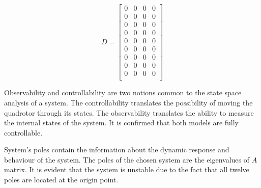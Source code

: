  \begin{equation}
 	D=\begin{bmatrix}
 	0 & 0 & 0 & 0 \\
 	0 & 0 & 0 & 0 \\
 	0 & 0 & 0 & 0 \\
 	0 & 0 & 0 & 0 \\
 	0 & 0 & 0 & 0 \\
 	0 & 0 & 0 & 0 \\
 	0 & 0 & 0 & 0 \\
 	0 & 0 & 0 & 0 \\
 	0 & 0 & 0 & 0 \\
 	\end{bmatrix}
 \end{equation}
 
Observability and controllability are two notions common to the state space analysis of a system. The controllability translates the possibility of moving the quadrotor through its states. The observability translates the ability to measure the internal states of the system. It is confirmed that both models are fully controllable. \cite{Report1}

System's poles contain the information about the dynamic response and behaviour of the system. The poles of the chosen system are the eigenvalues of $A$ matrix. It is evident that the system is unstable due to the fact that all twelve poles are located at the origin point.
